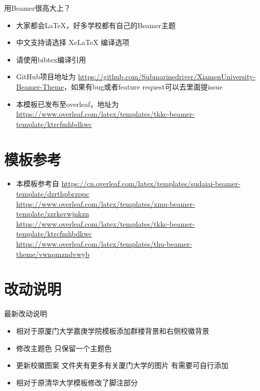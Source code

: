\documentclass{beamer}
\begin{document}
\begin{frame}{用Beamer很高大上？}
    \begin{itemize}[<+-| alert@+>] %
        \item 大家都会\LaTeX{}，好多学校都有自己的\textrm{Beamer}主题
        \item 中文支持请选择 Xe\LaTeX{} 编译选项
        \item 请使用bibtex编译引用
        \item GitHub项目地址为 \href{https://github.com/Submarinedriver/XiamenUniversity-Beamer-Theme}{https://github.com/Submarinedriver/XiamenUniversity-Beamer-Theme}，如果有bug或者feature request可以去里面提issue
        \item 本模板已发布至overleaf，地址为 \href{https://www.overleaf.com/latex/templates/tkkc-beamer-template/ktrcfmhbdkwc}{https://www.overleaf.com/latex/templates/tkkc-beamer-template/ktrcfmhbdkwc}
    \end{itemize}
\end{frame}


\section{模板参考}

\begin{frame}
    \begin{itemize}
        \item 本模板参考自 \url{https://cn.overleaf.com/latex/templates/sudaiai-beamer-template/dzrthpbrzppc}\cite{origin1}\\
        \url{https://www.overleaf.com/latex/templates/xmu-beamer-template/zzrksvwjnkzn}\cite{origin2}\\
        \url{https://www.overleaf.com/latex/templates/tkkc-beamer-template/ktrcfmhbdkwc}\cite{origin3}\\
        \url{https://www.overleaf.com/latex/templates/thu-beamer-theme/vwnqmzndvwyb}\cite{origin4}
    \end{itemize}
\end{frame}


\section{改动说明}

\begin{frame}{最新改动说明}
    \begin{itemize}
        \item 相对于原厦门大学嘉庚学院模板添加群楼背景和右侧校徽背景
        \item 修改主题色 只保留一个主题色
        \item 更新校徽图案 文件夹有更多有关厦门大学的图片 有需要可自行添加
        \item 相对于原清华大学模板修改了脚注部分
    \end{itemize}
\end{frame}
\end{document}
